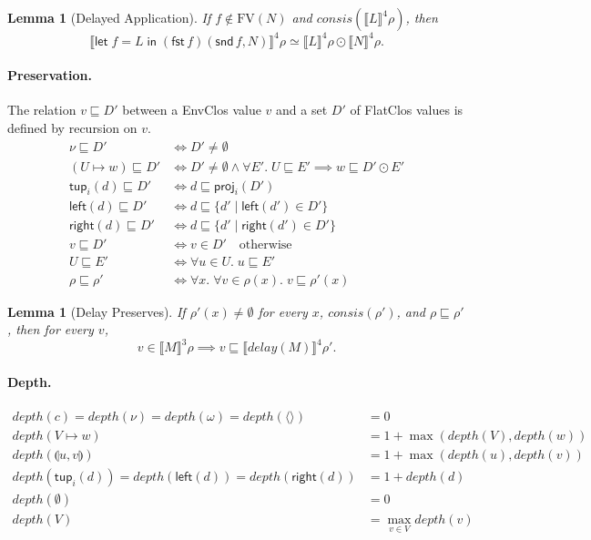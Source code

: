 \documentclass[10pt]{article}
\theoremstyle{acmplain}
\newtheorem{lemma}[theorem]{Lemma}
\newcommand{\SEM}[1]{\llbracket #1 \rrbracket}
\newcommand{\key}[1]{\mathsf{#1}}
\newcommand{\pass}[1]{\mathit{#1}}
\newcommand{\Let}{\key{let}\;}
\newcommand{\In}{\;\key{in}\;}
\newcommand{\FST}{\key{fst}\,}
\newcommand{\SND}{\key{snd}\,}
\newcommand{\pairv}[2]{\llparenthesis #1, #2 \rrparenthesis}
\newcommand{\tup}[2]{\key{tup}_{#1}(#2)}
\newcommand{\Left}[1]{\key{left}(#1)}
\newcommand{\Right}[1]{\key{right}(#1)}
\newcommand{\emptytup}{\langle\rangle}
\newcommand{\FV}{\mathrm{FV}}
\newcommand{\NE}{\neq\emptyset}
\newcommand{\consis}{\mathit{consis}}
\begin{document}
\begin{lemma}[Delayed Application]\label{lem:let-app}
If $f \notin \FV(N)$ and $\consis(\SEM{L}^{\mathrm{4}}\rho)$, then
\[
  \SEM{\Let f = L \In (\FST f)(\SND f, N)}^{\mathrm{4}}\rho
  \simeq \SEM{L}^{\mathrm{4}}\rho \odot \SEM{N}^{\mathrm{4}}\rho .
\]
\end{lemma}

\paragraph{Preservation.}
The relation $v \sqsubseteq D'$ between a EnvClos value $v$ and a set $D'$ of
FlatClos values is defined by recursion on $v$.
\begin{align*}
  \nu \sqsubseteq D' &\iff D' \NE \\
  (U \mapsto w) \sqsubseteq D' &\iff D' \NE \land
     \forall E'.\; U \sqsubseteq E' \implies w \sqsubseteq D' \odot E' \\
  \tup{i}{d} \sqsubseteq D' &\iff d \sqsubseteq \key{proj}_i(D') \\
  \Left{d} \sqsubseteq D' &\iff d \sqsubseteq \{ d' \mid \Left{d'} \in D' \} \\
  \Right{d} \sqsubseteq D' &\iff d \sqsubseteq \{ d' \mid \Right{d'} \in D' \} \\
  v \sqsubseteq D' &\iff v \in D' \quad \text{otherwise} \\[1ex]
  U \sqsubseteq E' &\iff \forall u \in U.\; u \sqsubseteq E' \\
  \rho \sqsubseteq \rho' &\iff \forall x.\; \forall v \in \rho(x).\; v \sqsubseteq \rho'(x)
\end{align*}

\begin{lemma}[Delay Preserves]\label{lem:delay-preserve}
If $\rho'(x) \NE$ for every $x$, $\consis(\rho')$, and $\rho \sqsubseteq \rho'$, then for every $v$,
\[
  v \in \SEM{M}^{\mathrm{3}}\rho \implies v \sqsubseteq \SEM{\pass{delay}(M)}^{\mathrm{4}}\rho' .
\]
\end{lemma}

\paragraph{Depth.}
\begin{align*}
  \mathit{depth}(c) = \mathit{depth}(\nu) = \mathit{depth}(\omega) = \mathit{depth}(\emptytup) &= 0 \\
  \mathit{depth}(V \mapsto w) &= 1 + \max(\mathit{depth}(V), \mathit{depth}(w)) \\
  \mathit{depth}(\pairv{u}{v}) &= 1 + \max(\mathit{depth}(u), \mathit{depth}(v)) \\
  \mathit{depth}(\tup{i}{d}) = \mathit{depth}(\Left{d}) = \mathit{depth}(\Right{d})
    &= 1 + \mathit{depth}(d) \\
  \mathit{depth}(\emptyset) &= 0 \\
  \mathit{depth}(V) &= \max_{v \in V} \mathit{depth}(v)
\end{align*}
\end{document}
